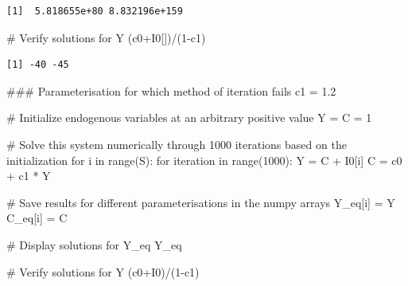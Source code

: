 \documentclass[
  letterpaper,
  DIV=11,
  numbers=noendperiod]{scrreprt}
\newenvironment{Shaded}{\begin{snugshade}}{\end{snugshade}}
\newcommand{\BuiltInTok}[1]{\textcolor[rgb]{0.00,0.23,0.31}{#1}}
\newcommand{\CommentTok}[1]{\textcolor[rgb]{0.37,0.37,0.37}{#1}}
\newcommand{\ControlFlowTok}[1]{\textcolor[rgb]{0.00,0.23,0.31}{#1}}
\newcommand{\DecValTok}[1]{\textcolor[rgb]{0.68,0.00,0.00}{#1}}
\newcommand{\FloatTok}[1]{\textcolor[rgb]{0.68,0.00,0.00}{#1}}
\newcommand{\KeywordTok}[1]{\textcolor[rgb]{0.00,0.23,0.31}{#1}}
\newcommand{\NormalTok}[1]{\textcolor[rgb]{0.00,0.23,0.31}{#1}}
\newcommand{\OperatorTok}[1]{\textcolor[rgb]{0.37,0.37,0.37}{#1}}
\newcommand{\SpecialCharTok}[1]{\textcolor[rgb]{0.37,0.37,0.37}{#1}}
\begin{document}
\begin{verbatim}
[1]  5.818655e+80 8.832196e+159
\end{verbatim}

\begin{Shaded}
\begin{Highlighting}[]
\CommentTok{\# Verify solutions for Y}
\NormalTok{(c0}\SpecialCharTok{+}\NormalTok{I0[])}\SpecialCharTok{/}\NormalTok{(}\DecValTok{1}\SpecialCharTok{{-}}\NormalTok{c1)}
\end{Highlighting}
\end{Shaded}

\begin{verbatim}
[1] -40 -45
\end{verbatim}

\begin{tcolorbox}[enhanced jigsaw, titlerule=0mm, breakable, bottomrule=.15mm, toprule=.15mm, colbacktitle=quarto-callout-note-color!10!white, rightrule=.15mm, toptitle=1mm, opacityback=0, left=2mm, coltitle=black, title=\textcolor{quarto-callout-note-color}{\faInfo}\hspace{0.5em}{Python code}, colframe=quarto-callout-note-color-frame, opacitybacktitle=0.6, leftrule=.75mm, bottomtitle=1mm, arc=.35mm, colback=white]

\begin{Shaded}
\begin{Highlighting}[]
\CommentTok{\#\#\# Parameterisation for which method of iteration fails}
\NormalTok{c1 }\OperatorTok{=} \FloatTok{1.2}  

\CommentTok{\# Initialize endogenous variables at an arbitrary positive value}
\NormalTok{Y }\OperatorTok{=}\NormalTok{ C }\OperatorTok{=} \DecValTok{1}

\CommentTok{\# Solve this system numerically through 1000 iterations based on the initialization}
\ControlFlowTok{for}\NormalTok{ i }\KeywordTok{in} \BuiltInTok{range}\NormalTok{(S):}
    \ControlFlowTok{for}\NormalTok{ iteration }\KeywordTok{in} \BuiltInTok{range}\NormalTok{(}\DecValTok{1000}\NormalTok{):}
\NormalTok{        Y }\OperatorTok{=}\NormalTok{ C }\OperatorTok{+}\NormalTok{ I0[i]}
\NormalTok{        C }\OperatorTok{=}\NormalTok{ c0 }\OperatorTok{+}\NormalTok{ c1 }\OperatorTok{*}\NormalTok{ Y}

    \CommentTok{\# Save results for different parameterisations in the numpy arrays}
\NormalTok{    Y\_eq[i] }\OperatorTok{=}\NormalTok{ Y}
\NormalTok{    C\_eq[i] }\OperatorTok{=}\NormalTok{ C}

\CommentTok{\# Display solutions for Y\_eq}
\NormalTok{Y\_eq}

\CommentTok{\# Verify solutions for Y}
\NormalTok{(c0}\OperatorTok{+}\NormalTok{I0)}\OperatorTok{/}\NormalTok{(}\DecValTok{1}\OperatorTok{{-}}\NormalTok{c1)}
\end{Highlighting}
\end{Shaded}

\end{tcolorbox}
\end{document}
